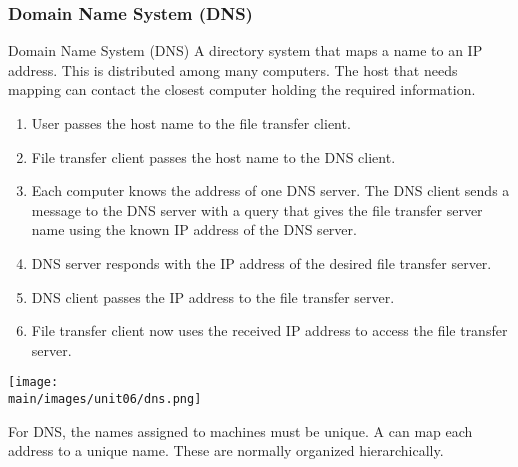 \documentclass[\main/notes.tex]{subfiles}
\begin{document}
				\subsubsection{Domain Name System (DNS)}
					\begin{definition}{Domain Name System (DNS)}
						A directory system that maps a name to an IP address. This is distributed among many computers. The host that needs mapping can contact the closest computer holding the required information.
						\begin{enumerate}
							\item User passes the host name to the file transfer client.
							\item File transfer client passes the host name to the DNS client.
							\item Each computer knows the address of one DNS server. The DNS client sends a message to the DNS server with a query that gives the file transfer server name using the known IP address of the DNS server.
							\item DNS server responds with the IP address of the desired file transfer server.
							\item DNS client passes the IP address to the file transfer server.
							\item File transfer client now uses the received IP address to access the file transfer server.
						\end{enumerate}
						\begin{center}
							\texttt{[image: \\main/images/unit06/dns.png]}
						\end{center}
					\end{definition}
					For DNS, the names assigned to machines must be unique. A  can map each address to a unique name. These are normally organized hierarchically.

					\pagebreak
\end{document}
